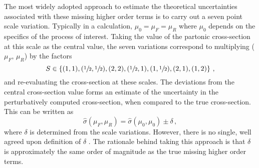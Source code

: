 \documentclass[main.tex]{subfiles}
\begin{document}
    The most widely adopted approach to estimate the
    theoretical uncertainties associated with these
    missing higher order terms is to carry out a seven point
    scale variation. Typically in a calculation,
    $\mu_{0} = \mu_{F} = \mu_{R}$ where $\mu_{0}$ depends on the specifics
    of the process of interest. Taking the value of the
    partonic cross-section at this scale as the central value,
    the seven variations correspond to multiplying ($\mu_{F}, \, \mu_{R}$) by the factors 
    \begin{equation}\label{eqn:scale_variations}
        S \in \left\{(1, 1), (\sfrac{1}{2}, \sfrac{1}{2}), (2, 2), (\sfrac{1}{2}, 1), (1, \sfrac{1}{2}), (2, 1), (1, 2) \right\} \, ,
    \end{equation}
    and re-evaluating the cross-section at these scales.
    The deviations from the central cross-section value
    forms an estimate of the uncertainty in the perturbatively
    computed cross-section, when compared to the true cross-section.
    This can be written as
    \begin{equation}
        \hat{\sigma}(\mu_{F}, \mu_{R}) = \hat{\sigma}(\mu_{0}, \mu_{0}) \pm \delta \, ,
    \end{equation}
    where $\delta$ is determined from the scale variations.
    However, there is no single, well agreed upon definition
    of $\delta$ \cite{Cacciari:2011ze}.
    The rationale behind taking this approach is that $\delta$
    is approximately the same order of magnitude as the true missing
    higher order terms.
\end{document}
